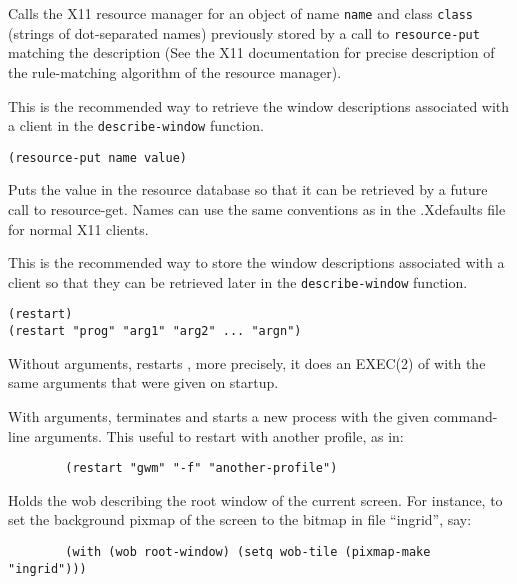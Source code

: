 Calls the X11 resource manager for an object of name \verb"name" and
class \verb"class" (strings of dot-separated names) previously stored
by a call to \verb"resource-put" matching the description (See the
X11 documentation for precise description of the rule-matching
algorithm of the resource manager).

This is the recommended way to retrieve the window descriptions associated
with a client in the \verb"describe-window" function.

        
{\usagefont\begin{verbatim}
(resource-put name value)
\end{verbatim}}\usageupspace

Puts the value in the {\GWM} resource database so that it can be retrieved by a
future call to resource-get. Names can use the same conventions as in the
.Xdefaults file for normal X11 clients.

This is the recommended way to store the window descriptions associated with a
client so that they can be retrieved later in the \verb"describe-window"
function.

        
{\usagefont\begin{verbatim}
(restart)
(restart "prog" "arg1" "arg2" ... "argn")
\end{verbatim}}\usageupspace

Without arguments, restarts {\GWM}, more precisely, it does an EXEC(2) of
{\GWM} with the same arguments that were given on startup.

With arguments, terminates {\GWM} and starts a new process with the given
command-line arguments. This useful to restart {\GWM} with another profile,
as in:

{\exemplefont\begin{verbatim}
        (restart "gwm" "-f" "another-profile")
\end{verbatim}}

        

Holds the wob describing the root window of the current screen. 
For instance, to set the background
pixmap of the screen to the bitmap in file ``ingrid'', say:

{\exemplefont\begin{verbatim}
        (with (wob root-window) (setq wob-tile (pixmap-make "ingrid")))
\end{verbatim}}

